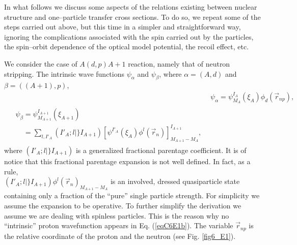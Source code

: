 In what follows we discuss some aspects of the relations existing between nuclear structure and one--particle transfer cross sections. To do so, we repeat some of the steps carried out above, but this time in a simpler and straightforward way, ignoring the complications associated with the spin carried out by the particles, the spin--orbit dependence of the optical model potential, the recoil effect, etc.

We consider the case of $A(d,p)A+1$ reaction, namely that of neutron stripping. The intrinsic wave functions $\psi_\alpha$ and $\psi_\beta$, where $\alpha=(A,d)$ and $\beta=((A+1),p)$,
\begin{subequations}
\begin{align}\label{eqC6E1}
&\psi_\alpha=\psi_{M_{A}}^{I_A}(\xi_A) \phi_d(\vec r_{np}),\\
\begin{split}\label{eqC6E1b}
&\psi_\beta=\psi_{M_{A+1}}^{I_{A+1}}(\xi_{A+1})\\
& \;\;\;\;=\sum_{l,I'_A} (I'_A;l \vert \} I_{A+1})
[\psi^{I'_A}(\xi_A)\phi^l(\vec r_{n})]_{M_{A+1}-M_A}^{I_{A+1}},
\end{split}
\end{align}
\end{subequations}
where $(I'_A;l \vert \} I_{A+1})$ is a generalized fractional parentage coefficient. It is of notice that this fractional parentage expansion is not well defined. In fact, as a rule,\\  \mbox{$(I'_A;l \vert \} I_{A+1})\phi^l(\vec r_{n})_{M_{A+1}-M_A}$} is an involved, dressed quasiparticle state containing only a fraction of the ``pure'' single particle strength. For simplicity we assume the expansion to be operative.	
To further simplify the derivation we assume we are dealing with spinless particles. This is the reason why no ``intrinsic'' proton wavefunction appears in Eq. (\ref{eqC6E1b}). The variable $\vec r_{np}$ is the relative coordinate of the proton and the neutron (see Fig. \ref{fig6_E1}).


